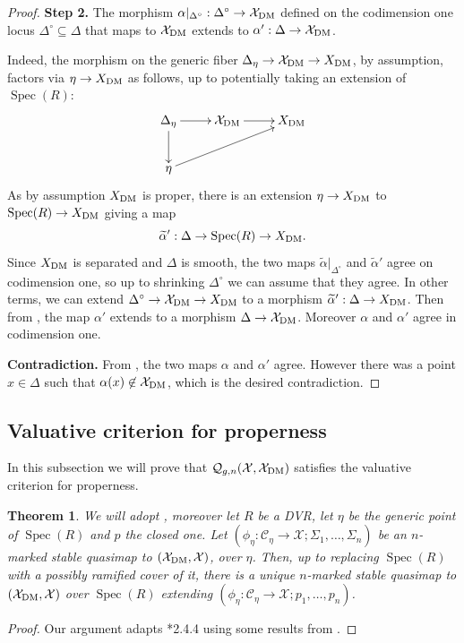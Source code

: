 \documentclass{amsart}
\newcommand{\sC}{\mathscr{C}}
\newcommand{\cQ}{\mathcal{Q}}
\newcommand{\cX}{\mathcal{X}}
\newcommand{\spec}{\operatorname{Spec}}
\newcommand{\dm}{{\rm DM}}
\newtheorem{Teo}[theorem]{Theorem}
\theoremstyle{definition}
\theoremstyle{definition}
\begin{document}
{\begin{proof}
     \textbf{Step 2.} The morphism $\alpha|_{\Delta^\circ}:\Delta^\circ\to \cX_\dm$ defined on the codimension one locus $\Delta^\circ\subseteq \Delta$ that maps to $\cX_\dm$ extends to $\alpha':\Delta\to \cX_\dm$.

     Indeed, the morphism on the generic fiber $\Delta_\eta\to \cX_\dm\to X_\dm$, by assumption, factors via $\eta\to X_\dm$ as follows, up to potentially taking an extension of $\spec(R)$:
     \[
     \xymatrix{\Delta_\eta\ar[r]\ar[d] & \cX_\dm\ar[r] & X_\dm\\\eta\ar[rru] & & }
     \]
     As by assumption $X_\dm$ is proper, there is an extension $\eta\to X_\dm$ to $\spec(R)\to X_\dm$ giving a map \[\widetilde{\alpha}':\Delta\to \spec(R)\to X_\dm.\] Since $X_\dm$ is separated and $\Delta$ is smooth, the two maps $\widetilde{\alpha}|_{\Delta^\circ}$ and $\widetilde{\alpha}'$ agree on codimension one, so up to shrinking $\Delta^\circ$ we can assume that they agree. In other terms, we can extend $\Delta^\circ\to \cX_\dm\to X_\dm$ to a morphism $\widetilde{\alpha}':\Delta\to X_\dm$. Then from , the map $\alpha'$ extends to a morphism $\Delta\to \cX_\dm$. Moreover $\alpha$ and $\alpha'$ agree in codimension one. 

     \textbf{Contradiction.} From , the two maps $\alpha$ and $\alpha'$ agree. However there was a point $x\in \Delta$ such that $\alpha(x)\not \in \cX_\dm$, which is the desired contradiction. \end{proof}

\subsection{Valuative criterion for properness}\label{section_qmaps_satisfy_the_val_crit_for_prop}
In this subsection we will prove that $\cQ_{g,n}(\cX,\cX_\dm)$ satisfies the valuative criterion for properness.
\begin{Teo}
    We will adopt , moreover let $R$ be a DVR, let $\eta$ be the generic point of $\spec(R)$ and $p$ the closed one. Let $(\phi_\eta:\sC_\eta\to \cX; \Sigma_{1},\ldots,\Sigma_{n})$ be an $n$-marked stable quasimap to $(\cX_{\dm},\cX)$, over $\eta$.
    Then, up to replacing $\spec(R)$ with a possibly ramified cover of it, there is a unique $n$-marked stable quasimap to $(\cX_{\dm},\cX)$ over $\spec(R)$ extending $(\phi_\eta:\sC_\eta\to \cX; p_{1},\ldots,p_{n})$. 
\end{Teo}
\begin{proof}Our argument adapts \cite{orbifold_qmap_theory}*{2.4.4} using some results from .    


\end{proof}}
\end{document}
